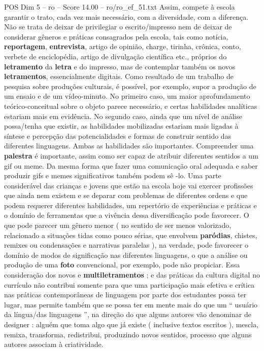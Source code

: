 \begin{textsample}{POS Dim 5 – ro – Score 14.00 – ro/ro\_ef\_51.txt}
Assim, compete à escola garantir o trato, cada vez mais necessário, com a diversidade, com a diferença.
Não se trata de deixar de privilegiar o escrito/impresso nem de deixar de considerar gêneros e práticas consagrados pela escola, tais como notícia, \textbf{reportagem}, \textbf{entrevista}, artigo de opinião, charge, tirinha, crônica, conto, verbete de enciclopédia, artigo de divulgação científica etc., próprios do \textbf{letramento} da \textbf{letra} e do impresso, mas de contemplar também os novos \textbf{letramentos}, essencialmente digitais.
Como resultado de um trabalho de pesquisa sobre produções culturais, é possível, por exemplo, supor a produção de um ensaio e de um vídeo-minuto.
No primeiro caso, um maior aprofundamento teórico-conceitual sobre o objeto parece necessário, e certas habilidades analíticas estariam mais em evidência.
No segundo caso, ainda que um nível de análise possa/tenha que existir, as habilidades mobilizadas estariam mais ligadas à síntese e percepção das potencialidades e formas de construir sentido das diferentes linguagens.
Ambas as habilidades são importantes.
Compreender uma \textbf{palestra} é importante, assim como ser capaz de atribuir diferentes sentidos a um gif ou meme.
Da mesma forma que fazer uma comunicação oral adequada e saber produzir gifs e memes significativos também podem sê -lo.
Uma parte considerável das crianças e jovens que estão na escola hoje vai exercer profissões que ainda nem existem e se deparar com problemas de diferentes ordens e que podem requerer diferentes habilidades, um repertório de experiências e práticas e o domínio de ferramentas que a vivência dessa diversificação pode favorecer.
O que pode parecer um gênero menor ( no sentido de ser menos valorizado, relacionado a situações tidas como pouco sérias, que envolvem \textbf{paródias}, chistes, remixes ou condensações e narrativas paralelas ), na verdade, pode favorecer o domínio de modos de significação nas diferentes linguagens, o que a análise ou produção de uma \textbf{foto} convencional, por exemplo, pode não propiciar.
Essa consideração dos novos e \textbf{multiletramentos} ; e das práticas da cultura digital no currículo não contribui somente para que uma participação mais efetiva e crítica nas práticas contemporâneas de linguagem por parte dos estudantes possa ter lugar, mas permite também que se possa ter em mente mais do que um “ usuário da língua/das linguagens ”, na direção do que alguns autores vão denominar de designer : alguém que toma algo que já existe ( inclusive textos escritos ), mescla, remixa, transforma, redistribui, produzindo novos sentidos, processo que alguns autores associam à criatividade.

\end{textsample}
